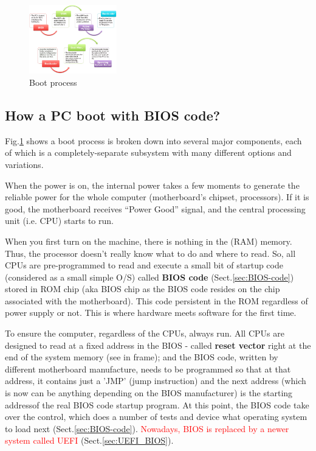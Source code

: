 \begin{figure}[hbt]
  \centerline{\includegraphics[height=3cm,
  angle=0]{./images/boot-process.eps}}
  \caption{Boot process}
  \label{fig:boot-process}
\end{figure}


\subsection{How a PC boot with BIOS code?}

Fig.\ref{fig:boot-process} shows a boot process is broken down into several
major components, each of which is a completely-separate subsystem with many
different options and variations.

When the power is on, the internal power takes a few moments to generate the
reliable power for the whole computer (motherboard's chipset,
processors). If it is good, the motherboard receives ``Power Good'' signal, and
the central processing unit (i.e. CPU) starts to run.

When you first turn on the machine, there is nothing in the (RAM) memory. Thus,
the processor doesn't really know what to do and where to read.
So, all CPUs are pre-programmed to read and execute a small bit of startup code
(considered as a small simple O/S) called {\bf BIOS code}
(Sect.\ref{sec:BIOS-code}) stored in ROM chip (aka BIOS chip as the BIOS code
resides on the chip associated with the motherboard). This code persistent in
the ROM regardless of power supply or not. This is where hardware meets software
for the first time.


To ensure the computer, regardless of the CPUs, always run. All CPUs are
designed to read at a fixed address in the BIOS - called {\bf reset vector}
right at the end of the system memory (see in frame); and the BIOS code, written
by different motherboard manufacture, needs to be programmed so that at that
address, it contains just a 'JMP' (jump instruction) and the next address
(which is now can be anything depending on the BIOS manufacturer) is the
starting addressof the real BIOS code startup program. At this point, the BIOS
code take over the control, which does a number of tests and device what
operating system to load next (Sect.\ref{sec:BIOS-code}).
\textcolor{red}{Nowadays, BIOS is replaced by a newer system called UEFI}
(Sect.\ref{sec:UEFI_BIOS}).

